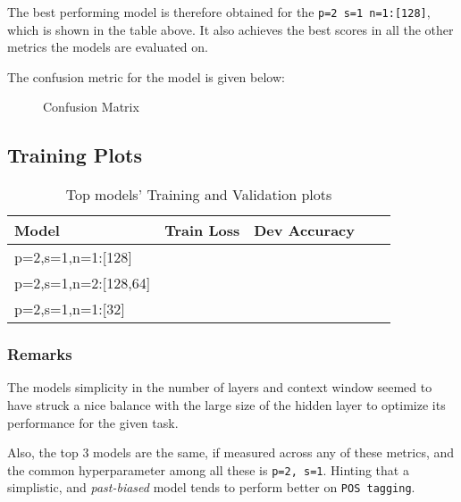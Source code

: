 The best performing model is therefore obtained for the \verb|p=2 s=1 n=1:[128]|, which is shown in the table above. It also achieves the best scores in all the other metrics the models are evaluated on.

The confusion metric for the model is given below:

\begin{figure}[h]
    \centering
    
    \caption{Confusion Matrix}
\end{figure}

\subsection*{Training Plots}


\begin{table}[H]\sffamily
    \centering
    \setlength{\tabcolsep}{25pt}
    \begin{tabular}{l*4{C}@{}}
        \toprule
        Model & Train Loss & Dev Accuracy \\ 
        \midrule
        p=2,s=1,n=1:[128] &  &  \\ 
        p=2,s=1,n=2:[128,64] &  &  \\ 
        p=2,s=1,n=1:[32] &  &  \\ 
        \bottomrule 
    \end{tabular}
    \caption{Top models' Training and Validation plots}
\end{table}

\subsubsection{Remarks}
The models simplicity in the number of layers and context window seemed to have struck a nice balance with the large size of the hidden layer to optimize its performance for the given task.

Also, the top 3 models are the same, if measured across any of these metrics, and the common hyperparameter among all these is \verb|p=2, s=1|. Hinting that a simplistic, and \textit{past-biased} model tends to perform better on \verb|POS tagging|.


